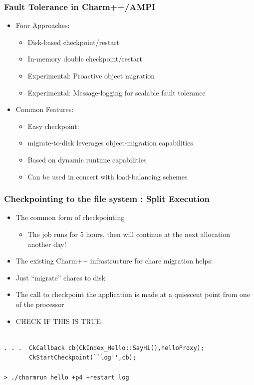 \begin{frame}[fragile]

  \frametitle{Fault Tolerance in Charm++/AMPI}

  \begin{itemize}
    \item Four Approaches:

      \begin{itemize}
\item Disk-based checkpoint/restart
\item In-memory double checkpoint/restart
\item Experimental: Proactive object migration 
\item Experimental: Message-logging for scalable fault tolerance
      \end{itemize}
    \item Common Features:
\begin{itemize}
\item Easy checkpoint: 
\item migrate-to-disk leverages object-migration capabilities
\item Based on dynamic runtime capabilities
\item Can be used in concert with load-balancing schemes
     \end{itemize}
  \end{itemize}
\end{frame}

\begin{frame}[fragile]
  \frametitle{Checkpointing to the file system : Split Execution}
\begin{itemize}
\item The common form of checkpointing
\begin{itemize}
\item The job runs for 5 hours, then will continue at the next
  allocation another day! 
\end{itemize}

\item The existing Charm++ infrastructure for chare migration helps:
\item Just ``migrate'' chares to disk
\item The call to checkpoint the application is made at a quiescent
  point from one of the processor

\item CHECK IF THIS IS TRUE
\end{itemize}

 \begin{lstlisting}[basicstyle=\footnotesize]

. . .  CkCallback cb(CkIndex_Hello::SayHi(),helloProxy);
       CkStartCheckpoint(``log'',cb);

> ./charmrun hello +p4 +restart log

\end{lstlisting}

\end{frame}


